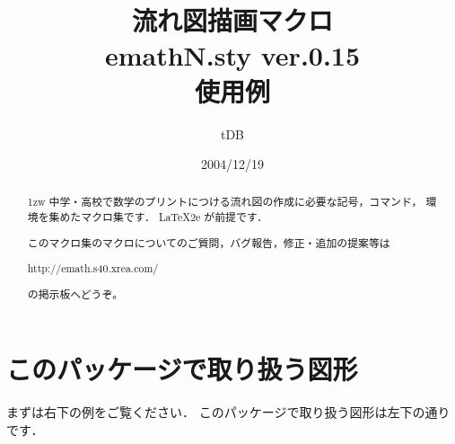 \documentclass[a4j]{jarticle}
\begin{document}
\title{流れ図描画マクロ\\
emathN.sty {\normalsize ver.0.15}\\使用例}
\author{tDB}
\date{2004/12/19}

\maketitle\thispagestyle{empty}
\begin{abstract}%
\parindent1zw%
中学・高校で数学のプリントにつける流れ図の作成に必要な記号，コマンド，
環境を集めたマクロ集です．
\LaTeX2e が前提です．

このマクロ集のマクロについてのご質問，バグ報告，修正・追加の提案等は
\begin{center}
http://emath.s40.xrea.com/
\end{center}
の掲示板へどうぞ。
\end{abstract}
\pagebreak
{}%

\tableofcontents

\pagebreak


\section{このパッケージで取り扱う図形}
まずは右下の例をご覧ください．
このパッケージで取り扱う図形は左下の通りです．\bigskip
\end{document}
